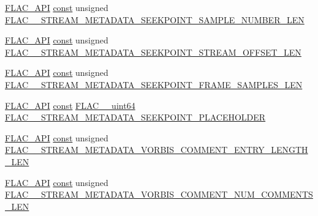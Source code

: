 \begin{DoxyCompactItemize}
\item 
\hyperlink{group__flac__export_ga56ca07df8a23310707732b1c0007d6f5}{F\+L\+A\+C\+\_\+\+A\+PI} \hyperlink{getopt1_8c_a2c212835823e3c54a8ab6d95c652660e}{const} unsigned \hyperlink{group__flac__format_ga8fe65704a9be1ad13a1654e78ab80c32}{F\+L\+A\+C\+\_\+\+\_\+\+S\+T\+R\+E\+A\+M\+\_\+\+M\+E\+T\+A\+D\+A\+T\+A\+\_\+\+S\+E\+E\+K\+P\+O\+I\+N\+T\+\_\+\+S\+A\+M\+P\+L\+E\+\_\+\+N\+U\+M\+B\+E\+R\+\_\+\+L\+EN}
\item 
\hyperlink{group__flac__export_ga56ca07df8a23310707732b1c0007d6f5}{F\+L\+A\+C\+\_\+\+A\+PI} \hyperlink{getopt1_8c_a2c212835823e3c54a8ab6d95c652660e}{const} unsigned \hyperlink{group__flac__format_gac351fcf185d0a36ddf6f0d358258ed5c}{F\+L\+A\+C\+\_\+\+\_\+\+S\+T\+R\+E\+A\+M\+\_\+\+M\+E\+T\+A\+D\+A\+T\+A\+\_\+\+S\+E\+E\+K\+P\+O\+I\+N\+T\+\_\+\+S\+T\+R\+E\+A\+M\+\_\+\+O\+F\+F\+S\+E\+T\+\_\+\+L\+EN}
\item 
\hyperlink{group__flac__export_ga56ca07df8a23310707732b1c0007d6f5}{F\+L\+A\+C\+\_\+\+A\+PI} \hyperlink{getopt1_8c_a2c212835823e3c54a8ab6d95c652660e}{const} unsigned \hyperlink{group__flac__format_gadf07cc8895679fc151c2cc4609d8c394}{F\+L\+A\+C\+\_\+\+\_\+\+S\+T\+R\+E\+A\+M\+\_\+\+M\+E\+T\+A\+D\+A\+T\+A\+\_\+\+S\+E\+E\+K\+P\+O\+I\+N\+T\+\_\+\+F\+R\+A\+M\+E\+\_\+\+S\+A\+M\+P\+L\+E\+S\+\_\+\+L\+EN}
\item 
\hyperlink{group__flac__export_ga56ca07df8a23310707732b1c0007d6f5}{F\+L\+A\+C\+\_\+\+A\+PI} \hyperlink{getopt1_8c_a2c212835823e3c54a8ab6d95c652660e}{const} \hyperlink{ordinals_8h_aa78c8c70a3eb8a58af7436f278acde8e}{F\+L\+A\+C\+\_\+\+\_\+uint64} \hyperlink{group__flac__format_ga39373aa806e3132146c1f29f35a23877}{F\+L\+A\+C\+\_\+\+\_\+\+S\+T\+R\+E\+A\+M\+\_\+\+M\+E\+T\+A\+D\+A\+T\+A\+\_\+\+S\+E\+E\+K\+P\+O\+I\+N\+T\+\_\+\+P\+L\+A\+C\+E\+H\+O\+L\+D\+ER}
\item 
\hyperlink{group__flac__export_ga56ca07df8a23310707732b1c0007d6f5}{F\+L\+A\+C\+\_\+\+A\+PI} \hyperlink{getopt1_8c_a2c212835823e3c54a8ab6d95c652660e}{const} unsigned \hyperlink{group__flac__format_ga0153a5ed9577e276250dc8414e236172}{F\+L\+A\+C\+\_\+\+\_\+\+S\+T\+R\+E\+A\+M\+\_\+\+M\+E\+T\+A\+D\+A\+T\+A\+\_\+\+V\+O\+R\+B\+I\+S\+\_\+\+C\+O\+M\+M\+E\+N\+T\+\_\+\+E\+N\+T\+R\+Y\+\_\+\+L\+E\+N\+G\+T\+H\+\_\+\+L\+EN}
\item 
\hyperlink{group__flac__export_ga56ca07df8a23310707732b1c0007d6f5}{F\+L\+A\+C\+\_\+\+A\+PI} \hyperlink{getopt1_8c_a2c212835823e3c54a8ab6d95c652660e}{const} unsigned \hyperlink{group__flac__format_gaa45c45967901bd6002d2a0ccbb208e02}{F\+L\+A\+C\+\_\+\+\_\+\+S\+T\+R\+E\+A\+M\+\_\+\+M\+E\+T\+A\+D\+A\+T\+A\+\_\+\+V\+O\+R\+B\+I\+S\+\_\+\+C\+O\+M\+M\+E\+N\+T\+\_\+\+N\+U\+M\+\_\+\+C\+O\+M\+M\+E\+N\+T\+S\+\_\+\+L\+EN}

\end{DoxyCompactItemize}
